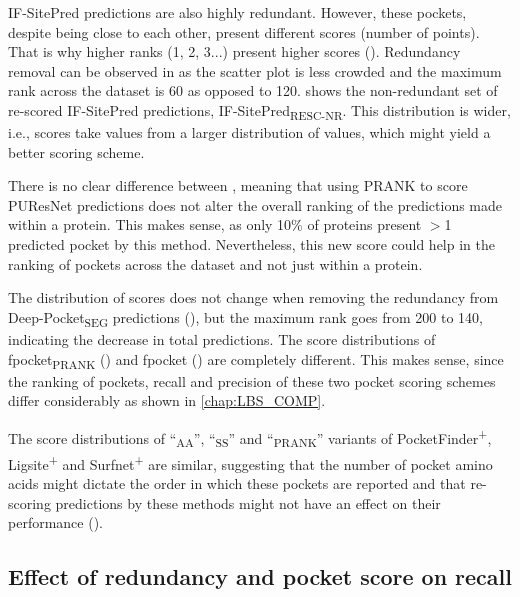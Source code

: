 IF-SitePred predictions are also highly redundant. However, these pockets, despite being close to each other, present different scores (number of points). That is why higher ranks (1, 2, 3...) present higher scores (). Redundancy removal can be observed in  as the scatter plot is less crowded and the maximum rank across the dataset is 60 as opposed to 120.  shows the non-redundant set of re-scored IF-SitePred predictions, IF-SitePred\textsubscript{RESC-NR}. This distribution is wider, i.e., scores take values from a larger distribution of values, which might yield a better scoring scheme.

There is no clear difference between , meaning that using PRANK to score PUResNet predictions does not alter the overall ranking of the predictions made within a protein. This makes sense, as only 10\% of proteins present $>$1 predicted pocket by this method. Nevertheless, this new score could help in the ranking of pockets across the dataset and not just within a protein.

The distribution of scores does not change when removing the redundancy from Deep-Pocket\textsubscript{SEG} predictions (), but the maximum rank goes from 200 to 140, indicating the decrease in total predictions. The score distributions of fpocket\textsubscript{PRANK} () and fpocket () are completely different. This makes sense, since the ranking of pockets, recall and precision of these two pocket scoring schemes differ considerably as shown in \autoref{chap:LBS_COMP}.

The score distributions of ``\textsubscript{AA}'', ``\textsubscript{SS}'' and ``\textsubscript{PRANK}'' variants of PocketFinder\textsuperscript{+}, Ligsite\textsuperscript{+} and Surfnet\textsuperscript{+} are similar, suggesting that the number of pocket amino acids might dictate the order in which these pockets are reported and that re-scoring predictions by these methods might not have an effect on their performance ().

\subsection{Effect of redundancy and pocket score on recall}

